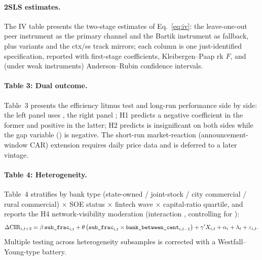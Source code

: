 \paragraph{2SLS estimates.}
The IV table presents the two-stage estimates of Eq.~\eqref{eq:iv}: the
leave-one-out peer instrument as the primary channel and the Bartik
instrument as fallback, plus  variants and the ctx/ss track
mirrors; each column is one just-identified specification, reported with
first-stage coefficients, Kleibergen--Paap rk $F$, and (under weak
instruments) Anderson--Rubin confidence intervals.

\paragraph{Table 3: Dual outcome.}
Table~3 presents the efficiency litmus test and long-run performance side by
side: the left panel uses , the right
panel ; H1 predicts a negative coefficient
in the former and positive in the latter; H2 predicts  is
insignificant on both sides while the gap variable
() is negative. The short-run
market-reaction (announcement-window CAR) extension requires daily price
data and is deferred to a later vintage.

\paragraph{Table 4: Heterogeneity.}
Table~4 stratifies by bank type (state-owned / joint-stock / city commercial
/ rural commercial) $\times$ SOE status $\times$ fintech wave $\times$
capital-ratio quartile, and reports the H4 network-visibility moderation
(interaction , controlling for
):
\begin{equation}
\Delta \mathrm{CIR}_{i,t+3}
 = \beta\,\texttt{sub\_frac}_{i,t}
 + \theta\,\bigl(\texttt{sub\_frac}_{i,t}\times
   \texttt{bank\_between\_cent}_{i,t-1}\bigr)
 + \gamma' X_{i,t} + \alpha_i + \lambda_t + \varepsilon_{i,t}.
\label{eq:mod}
\end{equation}
Multiple testing across heterogeneity subsamples is corrected with a
Westfall--Young-type battery.

